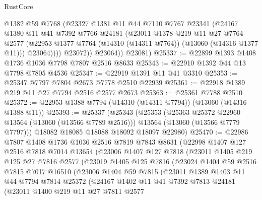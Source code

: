 \begin{lexlean}{RustCore}
\begin{coremodule}
                @1382
                @59
                @7768
                (@23327
                  @1381
                  @11
                  @44
                  @7110
                  @7767
                  @23341
                  (@24167
                    @1380
                    @11
                    @41
                    @7392
                    @7766
                    @24181
                    (@23011
                      @1378
                      @219
                      @11
                      @27
                      @7764
                      @2577
                      (@22953 @1377 @7764 (@14310 (@14311 @7764)) (@13060 (@14316 @1377 @11)))
                      @23064))))
              @23072))
          @23064))
      @23081)
@25337 := @22899 @1393 @1408 @1736 @1036 @7798 @7807 @2516 @8633
@25343 := @22910 @1392 @44 @13 @7798 @7805 @4536
@25347 := @22919 @1391 @11 @41 @3310
@25353 := @25347 @7797 @7804 @2673 @7778 @2510 @22939
@25361 := @22918 @1389 @219 @11 @27 @7794 @2516 @2577 @2673
@25363 := @25361 @7788 @2510
@25372 := @22953 @1388 @7794 (@14310 (@14311 @7794)) (@13060 (@14316 @1388 @11))
@25393 := @25337
    (@25343
      (@25353
        (@25363 @25372 @22960 @13564 (@13060 (@13566 @7789 @2516)))
        @13564
        (@13060 (@13566 @7779 @7797)))
      @18082
      @18085
      @18088
      @18092
      @18097
      @22980)
@25470 := @22986
    @7807
    @1408
    @1736
    @1036
    @2516
    @7819
    @7843
    @8631
    (@22998
      @1407
      @127
      @2516
      @7818
      @7014
      @13654
      (@23006
        @1407
        @127
        @7818
        (@23011
          @1405
          @219
          @125
          @27
          @7816
          @2577
          (@23019
            @1405
            @125
            @7816
            (@23024
              @1404
              @59
              @2516
              @7815
              @7017
              @16510
              (@23006
                @1404
                @59
                @7815
                (@23011
                  @1389
                  @1403
                  @11
                  @44
                  @7794
                  @7814
                  @25372
                  (@24167
                    @1402
                    @11
                    @41
                    @7392
                    @7813
                    @24181
                    (@23011
                      @1400
                      @219
                      @11
                      @27
                      @7811
                      @2577

\end{coremodule}
\end{lexlean}

